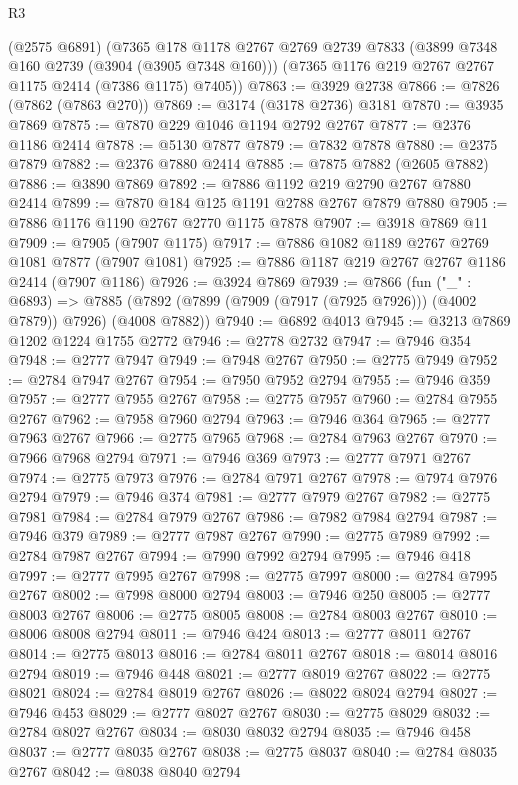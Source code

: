 \begin{lexlean}{R3}
\begin{coremodule}
    (@2575 @6891)
    (@7365
      @178
      @1178
      @2767
      @2769
      @2739
      @7833
      (@3899 @7348 @160 @2739 (@3904 (@3905 @7348 @160)))
      (@7365 @1176 @219 @2767 @2767 @1175 @2414 (@7386 @1175) @7405))
@7863 := @3929 @2738
@7866 := @7826 (@7862 (@7863 @270))
@7869 := @3174 (@3178 @2736) @3181
@7870 := @3935 @7869
@7875 := @7870 @229 @1046 @1194 @2792 @2767
@7877 := @2376 @1186 @2414
@7878 := @5130 @7877
@7879 := @7832 @7878
@7880 := @2375 @7879
@7882 := @2376 @7880 @2414
@7885 := @7875 @7882 (@2605 @7882)
@7886 := @3890 @7869
@7892 := @7886 @1192 @219 @2790 @2767 @7880 @2414
@7899 := @7870 @184 @125 @1191 @2788 @2767 @7879 @7880
@7905 := @7886 @1176 @1190 @2767 @2770 @1175 @7878
@7907 := @3918 @7869 @11
@7909 := @7905 (@7907 @1175)
@7917 := @7886 @1082 @1189 @2767 @2769 @1081 @7877 (@7907 @1081)
@7925 := @7886 @1187 @219 @2767 @2767 @1186 @2414 (@7907 @1186)
@7926 := @3924 @7869
@7939 := @7866
    (fun ("_" : @6893) =>
    @7885 (@7892 (@7899 (@7909 (@7917 (@7925 @7926))) (@4002 @7879)) @7926) (@4008 @7882))
@7940 := @6892 @4013
@7945 := @3213 @7869 @1202 @1224 @1755 @2772
@7946 := @2778 @2732
@7947 := @7946 @354
@7948 := @2777 @7947
@7949 := @7948 @2767
@7950 := @2775 @7949
@7952 := @2784 @7947 @2767
@7954 := @7950 @7952 @2794
@7955 := @7946 @359
@7957 := @2777 @7955 @2767
@7958 := @2775 @7957
@7960 := @2784 @7955 @2767
@7962 := @7958 @7960 @2794
@7963 := @7946 @364
@7965 := @2777 @7963 @2767
@7966 := @2775 @7965
@7968 := @2784 @7963 @2767
@7970 := @7966 @7968 @2794
@7971 := @7946 @369
@7973 := @2777 @7971 @2767
@7974 := @2775 @7973
@7976 := @2784 @7971 @2767
@7978 := @7974 @7976 @2794
@7979 := @7946 @374
@7981 := @2777 @7979 @2767
@7982 := @2775 @7981
@7984 := @2784 @7979 @2767
@7986 := @7982 @7984 @2794
@7987 := @7946 @379
@7989 := @2777 @7987 @2767
@7990 := @2775 @7989
@7992 := @2784 @7987 @2767
@7994 := @7990 @7992 @2794
@7995 := @7946 @418
@7997 := @2777 @7995 @2767
@7998 := @2775 @7997
@8000 := @2784 @7995 @2767
@8002 := @7998 @8000 @2794
@8003 := @7946 @250
@8005 := @2777 @8003 @2767
@8006 := @2775 @8005
@8008 := @2784 @8003 @2767
@8010 := @8006 @8008 @2794
@8011 := @7946 @424
@8013 := @2777 @8011 @2767
@8014 := @2775 @8013
@8016 := @2784 @8011 @2767
@8018 := @8014 @8016 @2794
@8019 := @7946 @448
@8021 := @2777 @8019 @2767
@8022 := @2775 @8021
@8024 := @2784 @8019 @2767
@8026 := @8022 @8024 @2794
@8027 := @7946 @453
@8029 := @2777 @8027 @2767
@8030 := @2775 @8029
@8032 := @2784 @8027 @2767
@8034 := @8030 @8032 @2794
@8035 := @7946 @458
@8037 := @2777 @8035 @2767
@8038 := @2775 @8037
@8040 := @2784 @8035 @2767
@8042 := @8038 @8040 @2794

\end{coremodule}
\end{lexlean}
